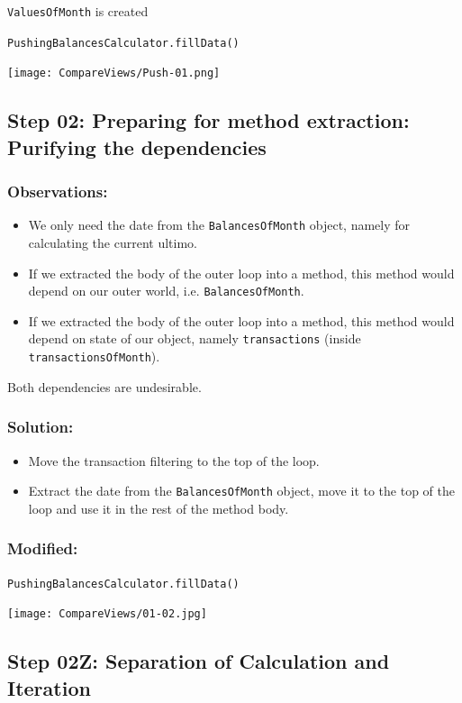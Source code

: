 \documentclass[a4paper,fleqn,titlepage,11pt]{article}
\begin{document}
\texttt{ValuesOfMonth} is created

\texttt{PushingBalancesCalculator.fillData()}

\texttt{[image: CompareViews/Push-01.png]}


\subsection*{Step 02: Preparing for method extraction: Purifying the dependencies}

\subsubsection*{Observations:}
\begin{itemize}
\item We only need the date from the \texttt{BalancesOfMonth} object, namely for calculating the current ultimo.
\item If we extracted the body of the outer loop into a method, this method would depend on our outer world, i.e. \texttt{BalancesOfMonth}.
\item If we extracted the body of the outer loop into a method, this method would depend on state of our object, namely \texttt{transactions} (inside \texttt{transactionsOfMonth}).
\end{itemize}

Both dependencies are undesirable.

\subsubsection*{Solution:}

\begin{itemize}
\item Move the transaction filtering to the top of the loop.
\item Extract the date from the \texttt{BalancesOfMonth} object, move it to the top of the loop and use it in the rest of the method body.
\end{itemize}

\subsubsection*{Modified:}

\texttt{PushingBalancesCalculator.fillData()}

\texttt{[image: CompareViews/01-02.jpg]}


\subsection*{Step 02Z: Separation of Calculation and Iteration}
\end{document}

